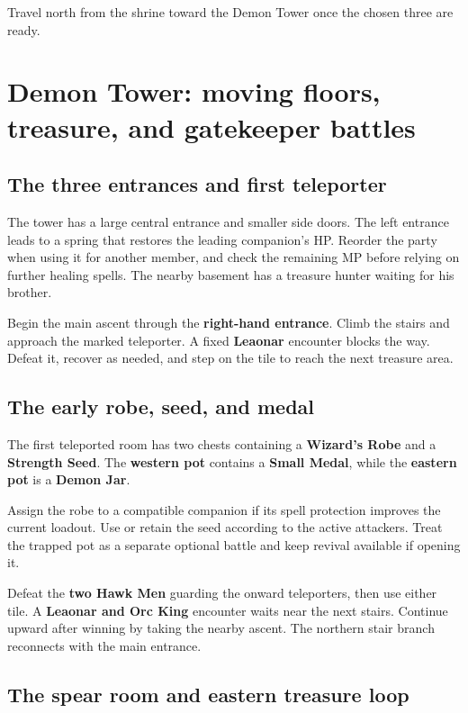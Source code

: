 Travel north from the shrine toward the Demon Tower once the
chosen three are ready.

\section{Demon Tower: moving floors, treasure, and gatekeeper battles}

\subsection*{The three entrances and first teleporter}

The tower has a large central entrance and smaller side doors.
The left entrance leads to a spring that restores the leading
companion's HP. Reorder the party when using it for another member,
and check the remaining MP before relying on further healing spells.
The nearby basement has a treasure hunter waiting for his brother.

Begin the main ascent through the \textbf{right-hand entrance}.
Climb the stairs and approach the marked teleporter. A fixed
\textbf{Leaonar} encounter blocks the way. Defeat it, recover
as needed, and step on the tile to reach the next treasure area.

\subsection*{The early robe, seed, and medal}

The first teleported room has two chests containing a
\textbf{Wizard's Robe} and a \textbf{Strength Seed}. The
\textbf{western pot} contains a \textbf{Small Medal}, while
the \textbf{eastern pot} is a \textbf{Demon Jar}.

Assign the robe to a compatible companion if its spell protection
improves the current loadout. Use or retain the seed according to
the active attackers. Treat the trapped pot as a separate optional
battle and keep revival available if opening it.

Defeat the \textbf{two Hawk Men} guarding the onward teleporters,
then use either tile. A \textbf{Leaonar and Orc King} encounter
waits near the next stairs. Continue upward after winning by taking
the nearby ascent. The northern stair branch reconnects with the
main entrance.

\subsection*{The spear room and eastern treasure loop}

